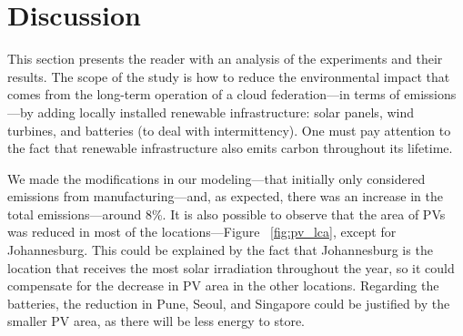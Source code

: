 










\section{Discussion}
\label{sec:long_term_discussion}

This section presents the reader with an analysis of the experiments and their results. The scope of the study is how to reduce the environmental impact that comes from the long-term operation of a cloud federation---in terms of  emissions---by adding locally installed renewable infrastructure: solar panels, wind turbines, and batteries (to deal with intermittency). One must pay attention to the fact that renewable infrastructure also emits carbon throughout its lifetime. 

We made the modifications in our modeling---that initially only considered emissions from manufacturing---and, as expected, there was an increase in the total emissions---around 8\%. It is also possible to observe that the area of PVs was reduced in most of the locations---Figure ~\ref{fig:pv_lca}, except for Johannesburg. This could be explained by the fact that Johannesburg is the location that receives the most solar irradiation throughout the year, so it could compensate for the decrease in PV area in the other locations. Regarding the batteries, the reduction in Pune, Seoul, and Singapore could be justified by the smaller PV area, as there will be less energy to store.

